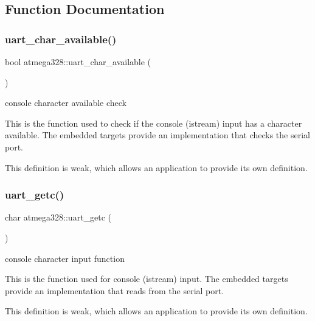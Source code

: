 \subsection{Function Documentation}
\mbox{\label{hwlib-atmega328_8hpp_file_a209a31828048372289a41def7830b7df}} 
\subsubsection{\texorpdfstring{uart\+\_\+char\+\_\+available()}{uart\_char\_available()}}
{\footnotesize\ttfamily bool atmega328\+::uart\+\_\+char\+\_\+available (\begin{DoxyParamCaption}{ }\end{DoxyParamCaption})}

console character available check

This is the function used to check if the console (istream) input has a character available. The embedded targets provide an implementation that checks the serial port.

This definition is weak, which allows an application to provide its own definition. \mbox{\label{hwlib-atmega328_8hpp_file_abbb8d9f17b9d0bbed06ddfb28c2cc90f}} 
\subsubsection{\texorpdfstring{uart\+\_\+getc()}{uart\_getc()}}
{\footnotesize\ttfamily char atmega328\+::uart\+\_\+getc (\begin{DoxyParamCaption}{ }\end{DoxyParamCaption})}

console character input function

This is the function used for console (istream) input. The embedded targets provide an implementation that reads from the serial port.

This definition is weak, which allows an application to provide its own definition. \mbox{\label{hwlib-atmega328_8hpp_file_ac98241515514f0cb2b4bebd38cbe944b}} 
